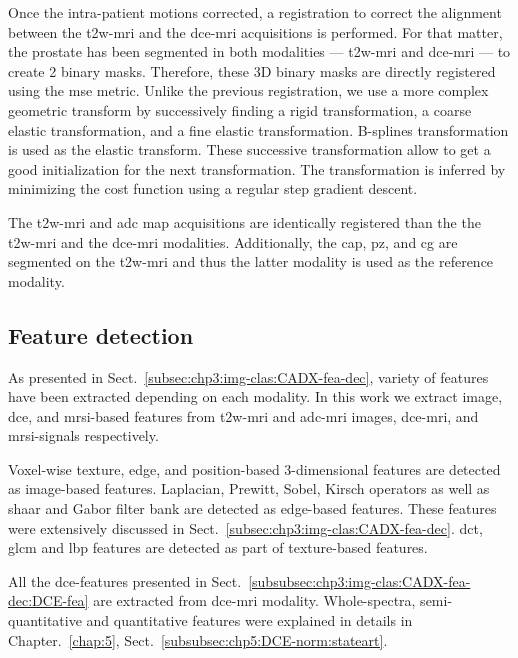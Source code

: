 Once the intra-patient motions corrected, a registration to correct the alignment between the \ac{t2w}-\ac{mri} and the \ac{dce}-\ac{mri} acquisitions is performed.
For that matter, the prostate has been segmented in both modalities --- \ac{t2w}-\ac{mri} and \ac{dce}-\ac{mri} --- to create 2 binary masks.
Therefore, these 3D binary masks are directly registered using the \ac{mse} metric.
Unlike the previous registration, we use a more complex geometric transform by successively finding a rigid transformation, a coarse elastic transformation, and a fine elastic transformation.
B-splines transformation is used as the elastic transform.
These successive transformation allow to get a good initialization for the next transformation.
The transformation is inferred by minimizing the cost function using a regular step gradient descent.

The \ac{t2w}-\ac{mri} and \ac{adc} map acquisitions are identically registered than the the \ac{t2w}-\ac{mri} and the \ac{dce}-\ac{mri} modalities.
Additionally, the \ac{cap}, \ac{pz}, and \ac{cg} are segmented on the \ac{t2w}-\ac{mri} and thus the latter modality is used as the reference modality.

\subsection{Feature detection}\label{subsec:chp6:method:fea-det}
As presented in Sect.~\ref{subsec:chp3:img-clas:CADX-fea-dec}, variety of features have been extracted depending on each modality.
In this work we extract image, \ac{dce}, and \ac{mrsi}-based features from \ac{t2w}-\ac{mri} and \ac{adc}-\ac{mri} images, \ac{dce}-\ac{mri}, and \ac{mrsi}-signals respectively.

Voxel-wise texture, edge, and position-based 3-dimensional features are detected as image-based features.
Laplacian, Prewitt, Sobel, Kirsch operators as well as {\color{red} shaar} and Gabor filter bank are detected as edge-based features.
These features were extensively discussed in Sect.~\ref{subsec:chp3:img-clas:CADX-fea-dec}.
\ac{dct}, \ac{glcm} and \ac{lbp} features are detected as part of texture-based features.

All the \ac{dce}-features presented in Sect.~\ref{subsubsec:chp3:img-clas:CADX-fea-dec:DCE-fea} are extracted from \ac{dce}-\ac{mri} modality.
Whole-spectra, semi-quantitative and quantitative features were explained in details in Chapter.~\ref{chap:5}, Sect.~\ref{subsubsec:chp5:DCE-norm:stateart}.

